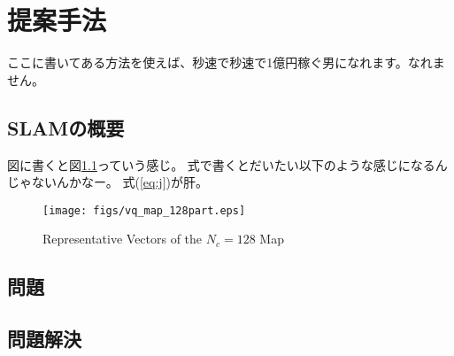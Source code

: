 \chapter{提案手法}\label{chap:method}

ここに書いてある方法を使えば、秒速で秒速で1億円稼ぐ男になれます。なれません。


\section{SLAMの概要}

図に書くと図\ref{fig:vq_map_128part}っていう感じ。
式で書くとだいたい以下のような感じになるんじゃないんかなー。
式(\ref{eq:j})が肝。

\begin{figure}[h]
        \begin{center}
        \texttt{[image: figs/vq\_map\_128part.eps]}
        \caption{Representative Vectors of the $N_c = 128$ Map}
        \label{fig:vq_map_128part}
        \end{center}
\end{figure}

\section{問題}

\section{問題解決}
